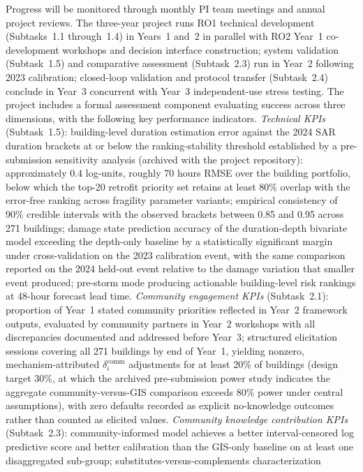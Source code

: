 \documentclass[11pt]{article}
\begin{document}
Progress will be monitored through monthly PI team meetings and annual project
reviews.
The three-year project runs RO1 technical development (Subtasks~1.1 through~1.4)
in Years~1 and~2 in parallel with RO2 Year~1 co-development workshops and
decision interface construction; system validation (Subtask~1.5) and comparative
assessment (Subtask~2.3) run in Year~2 following 2023 calibration; closed-loop
validation and protocol transfer (Subtask~2.4) conclude in Year~3 concurrent with
Year~3 independent-use stress testing.
The project includes a formal assessment component evaluating success across three
dimensions, with the following key performance indicators.
\textit{Technical KPIs} (Subtask~1.5): building-level duration estimation error
against the 2024 SAR duration brackets at or below the ranking-stability
threshold established by a pre-submission sensitivity analysis (archived with
the project repository): approximately 0.4 log-units, roughly 70 hours RMSE over
the building portfolio, below which the top-20 retrofit priority set retains at
least 80\% overlap with the error-free ranking across fragility parameter
variants; empirical consistency of 90\% credible intervals with
the observed brackets between
0.85 and 0.95 across 271 buildings; damage state prediction accuracy of the
duration-depth bivariate model exceeding the depth-only baseline by a statistically
significant margin under cross-validation on the 2023 calibration event, with the
same comparison reported on the 2024 held-out event relative to the damage
variation that smaller event produced; pre-storm mode producing actionable
building-level risk rankings at 48-hour forecast lead time.
\textit{Community engagement KPIs} (Subtask~2.1): proportion of Year~1 stated
community priorities reflected in Year~2 framework outputs, evaluated by community
partners in Year~2 workshops with all discrepancies documented and addressed before
Year~3; structured elicitation sessions covering all 271 buildings by end of
Year~1, yielding nonzero, mechanism-attributed $\delta_i^{\mathrm{comm}}$
adjustments for at least 20\% of buildings (design target 30\%, at which the
archived pre-submission power study indicates the aggregate community-versus-GIS
comparison exceeds 80\% power under central assumptions), with zero defaults
recorded as explicit no-knowledge outcomes rather than counted as elicited values.
\textit{Community knowledge contribution KPIs} (Subtask~2.3): community-informed
model achieves a better interval-censored log predictive score and better
calibration than the GIS-only baseline on at
least one disaggregated sub-group; substitutes-versus-complements characterization
\end{document}
